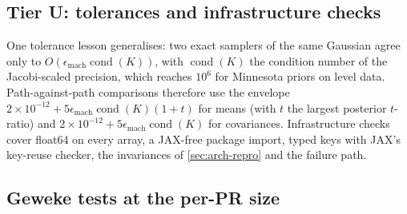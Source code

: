 \subsection{Tier U: tolerances and infrastructure checks}\label{app:tier-u}

One tolerance lesson generalises: two exact samplers of the same Gaussian agree only to
$O(\epsilon_{\mathrm{mach}}\operatorname{cond}(K))$, with $\operatorname{cond}(K)$ the condition number of the Jacobi-scaled
precision, which reaches $10^6$ for Minnesota priors on level data. Path-against-path comparisons
therefore use the envelope $2\times10^{-12} + 5\epsilon_{\mathrm{mach}}\operatorname{cond}(K)(1 + t)$ for means (with
$t$ the largest posterior $t$-ratio) and $2\times10^{-12} + 5\epsilon_{\mathrm{mach}}\operatorname{cond}(K)$ for
covariances. %
Infrastructure checks cover float64 on every array, a JAX-free package import, typed keys with
JAX's key-reuse checker, the invariances of \cref{sec:arch-repro} and the failure path.

\subsection{Geweke tests at the per-PR size}\label{app:geweke-small}

